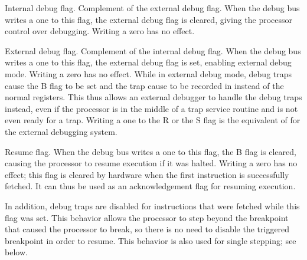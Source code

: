\implementation{}

Internal debug flag. Complement of the external debug flag. When the debug bus 
writes a one to this flag, the external debug flag is cleared, giving the
processor control over debugging. Writing a zero has no effect.

\implementation{}

External debug flag. Complement of the internal debug flag. When the debug bus 
writes a one to this flag, the external debug flag is set, enabling external
debug mode. Writing a zero has no effect. While in external debug mode, debug
traps cause the B flag to be set and the trap cause to be recorded in 
instead of the normal registers. This thus allows an external debugger to handle
the debug traps instead, even if the processor is in the middle of a trap
service routine and is not even ready for a trap. Writing a one to the R or the
S flag is the equivalent of  for the external debugging system.

\implementation{}

Resume flag. When the debug bus writes a one to this flag, the B flag is
cleared, causing the processor to resume execution if it was halted. Writing a
zero has no effect; this flag is cleared by hardware when the first instruction
is successfully fetched. It can thus be used as an acknowledgement flag for
resuming execution.

In addition, debug traps are disabled for instructions that were fetched while
this flag was set. This behavior allows the processor to step beyond the
breakpoint that caused the processor to break, so there is no need to disable
the triggered breakpoint in order to resume. This behavior is also used for
single stepping; see below.


